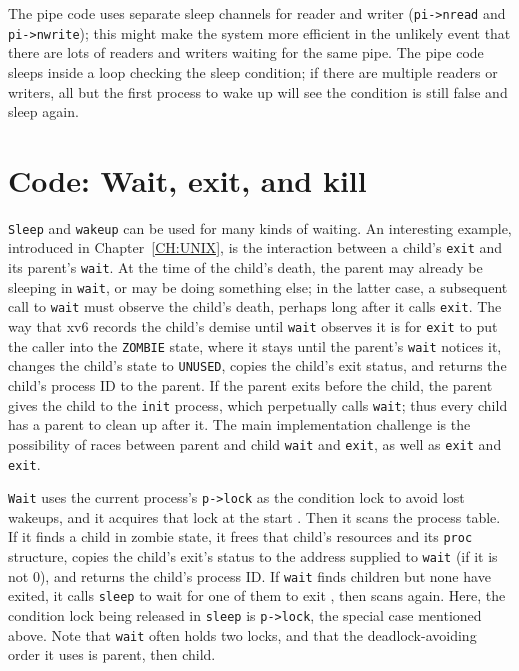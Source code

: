 The pipe code uses separate sleep channels for reader and writer
(\lstinline{pi->nread}
and
\lstinline{pi->nwrite});
this might make the system more efficient in the unlikely
event that there are lots of
readers and writers waiting for the same pipe.
The pipe code sleeps inside a loop checking the
sleep condition; if there are multiple readers
or writers, all but the first process to wake up
will see the condition is still false and sleep again.
\section{Code: Wait, exit, and kill}
\lstinline{Sleep}
and
\lstinline{wakeup}
can be used for many kinds of waiting.
An interesting example, introduced in Chapter~\ref{CH:UNIX},
is the interaction between a child's {\tt exit}
and its parent's {\tt wait}.
At the time of the child's death, the parent may already
be sleeping in {\tt wait}, or may be doing something else;
in the latter case, a subsequent call to {\tt wait} must
observe the child's death, perhaps long after it calls {\tt exit}.
The way that xv6 records the child's demise until {\tt wait}
observes it is for {\tt exit} to put the caller into the {\tt ZOMBIE}
state, where it stays until the parent's {\tt wait} notices it, changes
the child's state to {\tt UNUSED}, copies the child's exit status,
and returns the child's process ID to the parent.
If the parent exits before the child, the 
parent gives the child to the
\lstinline{init}
process, which perpetually calls {\tt wait};
thus
every child has a parent to clean up after it.
The main implementation challenge is
the possibility of races between
parent and child
\lstinline{wait}
and
\lstinline{exit},
as well as
\lstinline{exit}
and
\lstinline{exit}.

\lstinline{Wait}
uses the current process's
\lstinline{p->lock}
as the condition lock to avoid lost wakeups,
and it acquires that lock at the start
.
Then it scans the process table.
If it finds a child in zombie state,
it frees that child's resources and
its \lstinline{proc} structure, copies
the child's exit's status to the address supplied to \lstinline{wait}
(if it is not 0),
and returns the child's process ID.
If 
\lstinline{wait}
finds children but none have exited,
it calls
\lstinline{sleep}
to wait for one of them to exit
,
then scans again.
Here,
the condition lock being released in 
\lstinline{sleep}
is \lstinline{p->lock},
the special case mentioned above.
Note that \lstinline{wait} often holds two locks,
and that the deadlock-avoiding order it uses is
parent, then child.

